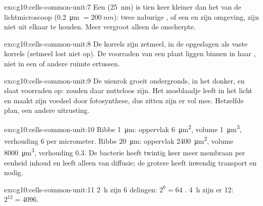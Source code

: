 \begin{solution}{exo:g10:cells-common-unit:7}
Een  (\qty{25}{nm}) is tien keer kleiner dan het  van de lichtmicroscoop (\qty{0.2}{\micro m} $= \qty{200}{nm}$): twee
naburige , of een  en zijn omgeving, zijn niet uit
elkaar te houden. Meer  vergroot alleen de onscherpte.
\end{solution}

\begin{solution}{exo:g10:cells-common-unit:8}
De korrels zijn zetmeel, in de  opgeslagen als vaste korrels
(zetmeel lost niet op). De voorraden van een plant liggen binnen in haar
, niet in een of andere ruimte ertussen.
\end{solution}

\begin{solution}{exo:g10:cells-common-unit:9}
De uienrok groeit ondergronds, in het donker, en slaat voorraden op:
 zouden daar nutteloos zijn. Het mosblaadje leeft in het
licht en maakt zijn voedsel door fotosynthese, dus zitten zijn 
er vol mee. Hetzelfde plan, een andere uitrusting.
\end{solution}

\begin{solution}{exo:g10:cells-common-unit:10}
Ribbe \qty{1}{\micro m}: oppervlak \qty{6}{\micro m^2}, volume
\qty{1}{\micro m^3}, verhouding 6 per micrometer. Ribbe
\qty{20}{\micro m}: oppervlak \qty{2400}{\micro m^2}, volume
\qty{8000}{\micro m^3}, verhouding 0.3. De bacterie heeft twintig keer
meer membraan per eenheid inhoud en leeft alleen van diffusie; de
grotere  heeft inwendig transport en  nodig.
\end{solution}

\begin{solution}{exo:g10:cells-common-unit:11}
\qty{2}{h} zijn 6 delingen: $2^6 = 64$ . \qty{4}{h} zijn er 12:
$2^{12} = 4096$.
\end{solution}

